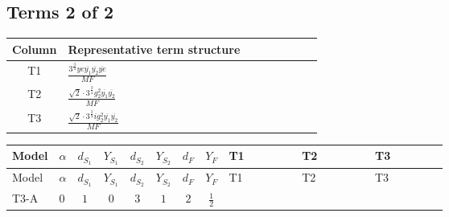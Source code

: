 \documentclass[8pt]{article}
\begin{document}
\begin{landscape}
\subsection*{Terms 2 of 2}
\begin{center}
\begin{tabular}{@{}c >{\raggedright\arraybackslash}p{0.82\linewidth}@{}}
\toprule
Column & Representative term structure \\
\midrule
T1 & \(\displaystyle \frac{3^{\frac{3}{4}} ye \overline{y_{1}} \overline{y_{2}} \overline{ye}}{MF}\) \\
\midrule
T2 & \(\displaystyle \frac{\sqrt{2} \cdot 3^{\frac{3}{4}} g_{2}^{2} \overline{y_{1}} \overline{y_{2}}}{MF}\) \\
\midrule
T3 & \(\displaystyle \frac{\sqrt{2} \cdot 3^{\frac{3}{4}} i g_{2}^{2} \overline{y_{1}} \overline{y_{2}}}{MF}\) \\
\midrule
\bottomrule
\end{tabular}
\end{center}
\smallskip
\tiny
\begin{longtable}{@{}llcccccc >{\raggedright\arraybackslash}p{0.21\linewidth} >{\raggedright\arraybackslash}p{0.21\linewidth} >{\raggedright\arraybackslash}p{0.21\linewidth}@{}}
\toprule
Model & $\alpha$ & $d_{S_1}$ & $Y_{S_1}$ & $d_{S_2}$ & $Y_{S_2}$ & $d_F$ & $Y_F$ & T1 & T2 & T3 \\
\midrule
\endfirsthead
\toprule
Model & $\alpha$ & $d_{S_1}$ & $Y_{S_1}$ & $d_{S_2}$ & $Y_{S_2}$ & $d_F$ & $Y_F$ & T1 & T2 & T3 \\
\midrule
\endhead
T3-A & $0$ & $1$ & $0$ & $3$ & $1$ & $2$ & $\frac{1}{2}$ & \scriptsize\adjustbox{max width=\linewidth}{$\begin{gathered} - \frac{3^{\frac{3}{4}} ye \overline{y_{1}} \overline{y_{2}} \overline{ye}}{12 MF}\end{gathered}$} & \scriptsize\adjustbox{max width=\linewidth}{$\begin{gathered} \frac{\sqrt{2} \cdot 3^{\frac{3}{4}} g_{2}^{2} \overline{y_{1}} \overline{y_{2}}}{6 MF}\end{gathered}$} & \scriptsize\adjustbox{max width=\linewidth}{$\begin{gathered} - \frac{\sqrt{2} \cdot 3^{\frac{3}{4}} i g_{2}^{2} \overline{y_{1}} \overline{y_{2}}}{6 MF}\end{gathered}$} \\
\midrule
\bottomrule
\end{longtable}
\clearpage

\end{landscape}
\end{document}
